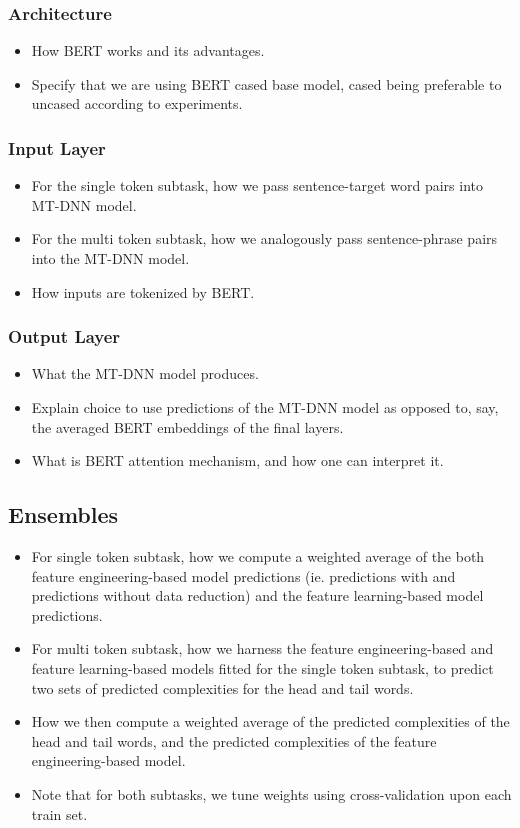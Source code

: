 \documentclass[11pt,a4paper]{article}
\begin{document}
\subsubsection{Architecture}
\begin{itemize}
  \item How BERT works and its advantages.
  \item Specify that we are using BERT cased base model, cased being preferable to uncased according to experiments.
\end{itemize}

\subsubsection{Input Layer}
\begin{itemize}
  \item For the single token subtask, how we pass sentence-target word pairs into MT-DNN model.
  \item For the multi token subtask, how we analogously pass sentence-phrase pairs into the MT-DNN model.
  \item How inputs are tokenized by BERT.
\end{itemize}

\subsubsection{Output Layer}
\begin{itemize}
  \item What the MT-DNN model produces.
  \item Explain choice to use predictions of the MT-DNN model as opposed to, say, the averaged BERT embeddings of the final layers.
  \item What is BERT attention mechanism, and how one can interpret it.
\end{itemize}

\subsection{Ensembles}
\begin{itemize}
  \item For single token subtask, how we compute a weighted average of the both feature engineering-based model predictions (ie. predictions with and predictions without data reduction) and the feature learning-based model predictions.
  \item For multi token subtask, how we harness the feature engineering-based and feature learning-based models fitted for the single token subtask, to predict two sets of predicted complexities for the head and tail words.
  \item How we then compute a weighted average of the predicted complexities of the head and tail words, and the predicted complexities of the feature engineering-based model.
  \item Note that for both subtasks, we tune weights using cross-validation upon each train set.
\end{itemize}
\end{document}
